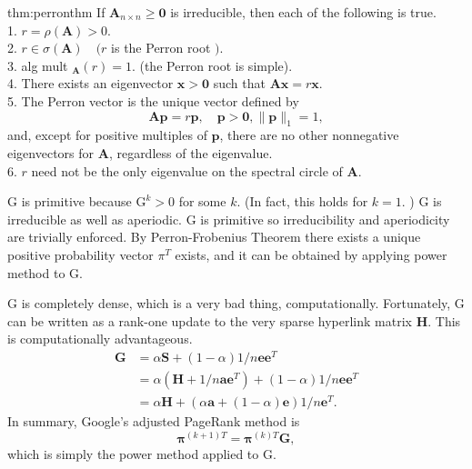 \begin{thm}{thm:perronthm}
	If $\mathbf{A}_{n \times n} \geq \mathbf{0}$ is irreducible, then each of the following is true.\\
	1. $r=\rho(\mathbf{A})>0$.\\
	2. $r \in \sigma(\mathbf{A}) \quad(r$ is the Perron root $)$.\\
	3. alg mult $_{\mathbf{A}}(r)=1$. (the Perron root is simple).\\
	4. There exists an eigenvector $\mathbf{x}>\mathbf{0}$ such that $\mathbf{A} \mathbf{x}=r \mathbf{x}$.\\
	5. The Perron vector is the unique vector defined by
	$$
	\mathbf{A p}=r \mathbf{p}, \quad \mathbf{p}>\mathbf{0},\|\mathbf{p}\|_{1}=1,
	$$
	and, except for positive multiples of $\mathbf{p}$, there are no other nonnegative eigenvectors for $\mathbf{A}$, regardless of the eigenvalue.\\
	6. $r$ need not be the only eigenvalue on the spectral circle of $\mathbf{A}$.
\end{thm}

\noindent $\mathrm{G}$ is primitive because $\mathrm{G}^{k}>0$ for some $k$. (In fact, this holds for $k=1 .$ ) G is irreducible as well as aperiodic. G is primitive so irreducibility and aperiodicity are trivially enforced. By Perron-Frobenius Theorem there exists a unique positive probability vector $\pi^{T}$ exists, and it can be obtained by applying power method to $\mathrm{G}$.

\noindent $\mathrm{G}$ is completely dense, which is a very bad thing, computationally. Fortunately, $\mathrm{G}$ can be written as a rank-one update to the very sparse hyperlink matrix $\mathbf{H}$. This is computationally advantageous.
$$
\begin{aligned}
	\mathbf{G} &=\alpha \mathbf{S}+(1-\alpha) 1 / n \mathbf{e e}^{T} \\
	&=\alpha\left(\mathbf{H}+1 / n \mathbf{a e}^{T}\right)+(1-\alpha) 1 / n \mathbf{e e}^{T} \\
	&=\alpha \mathbf{H}+(\alpha \mathbf{a}+(1-\alpha) \mathbf{e}) 1 / n \mathbf{e}^{T} .
\end{aligned}
$$
In summary, Google's adjusted PageRank method is
$$
\boldsymbol{\pi}^{(k+1) T}=\boldsymbol{\pi}^{(k) T} \mathbf{G},
$$
which is simply the power method applied to $\mathrm{G}$.